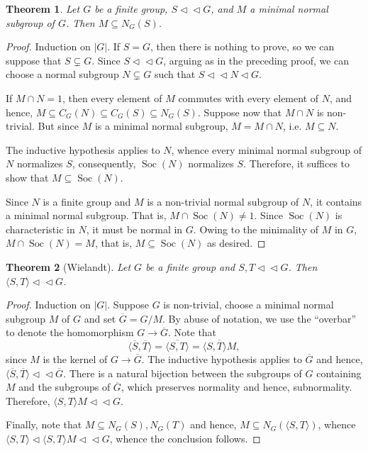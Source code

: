 \documentclass[12pt]{article}
\theoremstyle{thmstyle}
\newtheorem{theorem}{Theorem}[section]
\theoremstyle{defstyle}
\newcommand{\nor}{\vartriangleleft}
\newcommand{\subnor}{\nor\!\nor}
\newcommand{\Soc}{\operatorname{Soc}}
\begin{document}
\begin{theorem}
    Let $G$ be a finite group, $S\subnor G$, and $M$ a minimal normal subgroup of $G$. Then $M\subseteq N_G(S)$.
\end{theorem}
\begin{proof}
    Induction on $|G|$. If $S = G$, then there is nothing to prove, so we can suppose that $S\subsetneq G$. Since $S\subnor G$, arguing as in the preceding proof, we can choose a normal subgroup $N\subsetneq G$ such that $S\subnor N\nor G$.

    If $M\cap N = 1$, then every element of $M$ commutes with every element of $N$, and hence, $M\subseteq C_G(N)\subseteq C_G(S)\subseteq N_G(S)$. Suppose now that $M\cap N$ is non-trivial. But since $M$ is a minimal normal subgroup, $M = M\cap N$, i.e. $M\subseteq N$.

    The inductive hypothesis applies to $N$, whence every minimal normal subgroup of $N$ normalizes $S$, consequently, $\Soc(N)$ normalizes $S$. Therefore, it suffices to show that $M\subseteq\Soc(N)$. 

    Since $N$ is a finite group and $M$ is a non-trivial normal subgroup of $N$, it contains a minimal normal subgroup. That is, $M\cap\Soc(N)\ne 1$. Since $\Soc(N)$ is characteristic in $N$, it must be normal in $G$. Owing to the minimality of $M$ in $G$, $M\cap\Soc(N) = M$, that is, $M\subseteq\Soc(N)$ as desired.
\end{proof}

\begin{theorem}[Wielandt]
    Let $G$ be a finite group and $S,T\subnor G$. Then $\langle S, T\rangle\subnor G$.
\end{theorem}
\begin{proof}
    Induction on $|G|$. Suppose $G$ is non-trivial, choose a minimal normal subgroup $M$ of $G$ and set $\overline G = G/M$. By abuse of notation, we use the ``overbar'' to denote the homomorphism $G\to\overline G$. Note that 
    \begin{equation*}
        \langle\overline S,\overline T\rangle = \overline{\langle S, T\rangle} = \overline{\langle S, T\rangle M},
    \end{equation*}
    since $M$ is the kernel of $G\to\overline G$. The inductive hypothesis applies to $\overline G$ and hence, $\langle\overline S,\overline T\rangle\subnor\overline G$. There is a natural bijection between the subgroups of $G$ containing $M$ and the subgroups of $\overline G$, which preserves normality and hence, subnormality. Therefore, $\langle S, T\rangle M\subnor G$.

    Finally, note that $M\subseteq N_G(S), N_G(T)$ and hence, $M\subseteq N_G(\langle S, T\rangle)$, whence $\langle S, T\rangle\nor\langle S, T\rangle M\subnor G$, whence the conclusion follows.
\end{proof}
\end{document}
